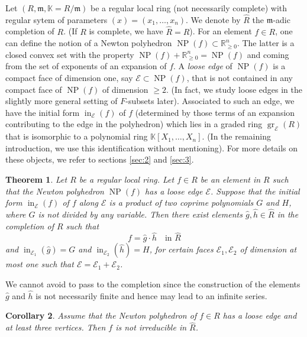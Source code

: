 \documentclass[11pt]{amsart}
\theoremstyle{plain}
\newtheorem{Thm}{Theorem}[section]
\newtheorem{Cor}[Thm]{Corollary}
\theoremstyle{definition}
\numberwithin{equation}{section}
\newcommand{\gr}{\operatorname{gr}}
\newcommand{\ini}{\operatorname{in}}
\newcommand{\NP}{\operatorname{NP}}
\newcommand{\KK}{{\mathbb K}}
\newcommand{\RR}{\mathbb R}
\newcommand{\cE}{\mathcal{E}}
\newcommand{\Edge}{\cE}
\newcommand{\fm}{\mathfrak m}
\newcommand{\gqz}{{\geq 0}}
\renewcommand{\(}{(\!(}
\renewcommand{\)}{)\!)}
\begin{document}
Let $ ( R, \fm, \KK = R/\fm ) $ be a regular local ring (not necessarily complete) with regular sytem of parameters $ (x) = (x_1, \ldots, x_n) $.
We denote by $ \widehat R $ the $ \fm $-adic completion of $ R $.
(If $ R $ is complete, we have $ \widehat R = R $).
For an element $ f \in R $, one can define the notion of a {Newton polyhedron} $ \NP(f) \subset \RR^n_\gqz $.
The latter is a closed convex set with the property 
$ \NP(f) + \RR^n_\gqz = \NP(f) $ and
coming from the set of exponents of an expansion of $ f $.
A {\em loose edge} of $ \NP(f) $ is a compact face of dimension one, say $ \Edge \subset \NP(f) $, that is not contained in any compact face of $ \NP(f) $ of dimension $ \geq 2 $. 
(In fact, we study loose edges in the slightly more general setting of $ F $-subsets later).
Associated to such an edge, we have the initial form $ \ini_\cE (f) $ of $ f $ (determined by those terms of an expansion contributing to the edge in the polyhedron)
which lies in a graded ring $ \gr_\cE (R) $ that is isomorphic to a polynomial ring $ \KK[X_1, \ldots, X_n ]$. 
(In the remaining introduction, we use this identification without mentioning).
For more details on these objects, we refer to sections \ref{sec:2} and \ref{sec:3}.

\begin{Thm}
	\label{Thm_1.1}
	Let $ R $ be a regular local ring.
	Let $ f \in R $ be an element in $ R $ such that the Newton polyhedron $ \NP(f) $ has a loose edge $ \cE $. 
	Suppose that the initial form $ \ini_\cE (f) $ of $ f $ along $ \cE $
	is a product of two coprime polynomials $ G $ and $ H $,
	where $ G $ is not divided by any variable.
	Then there exist elements $ \widehat g, \widehat h \in \widehat R $ in the completion of $ R $ such that 
	\[
		f = \widehat g \cdot \widehat h \ \ \ \mbox{ in } \widehat R
	\] 
	and $ \ini_{\cE_1} (\widehat g) = G $ and $ \ini_{\cE_2} (\widehat h) = H $, for certain faces $ \cE_1, \cE_2 $ of dimension at most one such that $ \cE= \cE_1 + \cE_2 $. 
\end{Thm}


We cannot avoid to pass to the completion since the construction of the elements $ \widehat g $ and $ \widehat h $ 
is not necessarily finite and hence may lead to an infinite series.


\begin{Cor}
	\label{Cor_1.2}
	Assume that the Newton polyhedron of $ f \in R $ has a loose edge and at least three vertices.
	Then $ f $ is not irreducible in $ \widehat R $.
\end{Cor}
\end{document}
